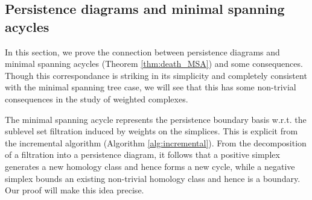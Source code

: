 \documentclass[12pt]{amsart}
\newcommand{\dy}[1]{\textcolor{magenta}{#1}}
\renewcommand{\dy}[1]{#1}
\numberwithin{equation}{section}
\numberwithin{theorem}{section}
\newcommand{\1}{\mathbf{1}}
\def\sC{\mathscr{C}}
\def\K{\mathcal{K}}
\begin{document}
\begin{comment}
Since $\sC$ is a cycle and $\sC \setminus \sigma$ is an acycle, $supp(\partial (\sC \setminus \sigma))$ is $d-$hypergraph connected in $\K(\sigma^-)$ by Lemma \ref{lem:supp_conn}. Since $supp(\partial \sigma) \subset supp(\partial (\sC \setminus \sigma))$ and $supp(\partial \sigma) \cap supp(\partial S) \neq \emptyset$, we have that $supp(\partial (\sC \setminus \sigma)) \cap supp(\partial S) \neq \emptyset$. Hence, $\sC \setminus (S \cup \sigma) \subset S^*$. Thus, the Prim's algorithm shall consider all $d-$faces in $\sC \setminus (S \cup \sigma)$ before considering $\sigma$.

Now we divide into two cases. Suppose all $\tau \in \sC \setminus (S \cup \sigma)$ were considered at a stage of the Prim's algorithm before the current step, then since $S \cup (\sC \setminus \sigma)$ is acyclic, by Lemma \ref{lem:+ve_faces} each $\tau$ should have been added to the spanning acycle at that stage of the algorithm leading to the contradiction that $\tau \in S$.

Consider the next case that there exists a $\tau \in \sC \setminus (S \cup \sigma)$ which is considered at a step after the current step. As $\tau \in S^*$, $\tau$ is considered before $\sigma$ by the Prim's algorithm. Since $\sigma$ is the next $d-$simplex added after $S$, the acycle at the step when $\tau$ is considered is still $S$. But since $S \cup (\sC \setminus \sigma)$ is acyclic, $\tau$ is a negative face with respect to $\K^{d-1} \cup S$ and thus $\tau$ is added to $S$ contradicting the fact $\sigma$ is the next $d-$face added to $S$.

Thus we get that $\sigma \in M_1$ and hence $S \cup \{\sigma\} \subset M_1$ completing the proof.
\end{proof}
\end{comment}


\subsection{Persistence diagrams and minimal spanning acycles}
\label{sec:MSA_persistence}
%
In this section, we prove the connection between persistence diagrams and minimal spanning acycles (Theorem \ref{thm:death_MSA}) and some consequences. \dy{Though this correspondance is striking in its simplicity and completely consistent with the minimal spanning tree case, we will see that this has some non-trivial consequences in the study of weighted complexes.} 

The minimal spanning acycle represents the persistence boundary basis w.r.t. the sublevel set filtration induced by weights on the simplices. This is explicit from the incremental  algorithm (Algorithm \ref{alg:incremental}). From the decomposition of a filtration into a persistence diagram, it follows that a positive simplex generates a new homology class and hence forms a new cycle, while a negative simplex bounds an existing non-trivial homology class and hence is a boundary. \dy{Our proof will make this idea precise.}
\end{document}
